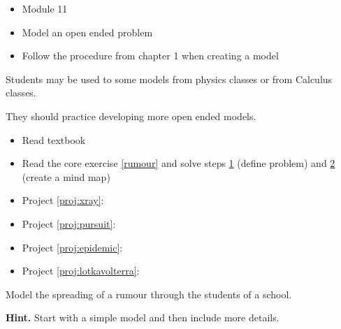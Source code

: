 \begin{lesson}

	\begin{itemize}
		\item Module 11
	\end{itemize}

	\begin{itemize}
		\item Model an open ended problem
		\item Follow the procedure from chapter 1 when creating a model
	\end{itemize}
	

Students may be used to some models from physics classes or from Calculus classes. 

They should practice developing more open ended models.

\begin{itemize}
	\item Read textbook
	\item Read the core exercise \ref{rumour} and solve steps \hyperref[moddefine]{1} (define problem) and \hyperref[mindmap]{2} (create a mind map)
\end{itemize}

\begin{itemize}
	\item Project \ref{proj:xray}: \xraytitle
	\item Project \ref{proj:pursuit}: \pursuittitle
	\item Project \ref{proj:epidemic}: \epidemictitle
	\item Project \ref{proj:lotkavolterra}: \lotkavolterratitle
\end{itemize}

\end{lesson}


\question \label{rumour} Model the spreading of a rumour through the students of a school.

\textbf{Hint.} Start with a simple model and then include more details.



\standardonlynewpage



